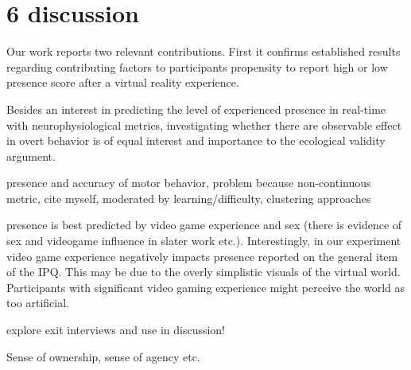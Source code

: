 \section{6 discussion}
Our work reports two relevant contributions. First it confirms established results regarding contributing factors to participants propensity to report high or low presence score after a virtual reality experience.

Besides an interest in predicting the level of experienced presence in real-time with neurophysiological metrics, investigating whether there are observable effect in overt behavior is of equal interest and importance to the ecological validity argument.


presence and accuracy of motor behavior, problem because non-continuous metric, cite myself, moderated by learning/difficulty, clustering approaches

presence is best predicted by video game experience and sex (there is evidence of sex and videogame influence in slater work etc.). Interestingly, in our experiment video game experience negatively impacts presence reported on the general item of the IPQ. This may be due to the overly simplistic visuals of the virtual world. Participants with significant video gaming experience might perceive the world as too artificial.

explore exit interviews and use in discussion!

Sense of ownership, sense of agency etc.

